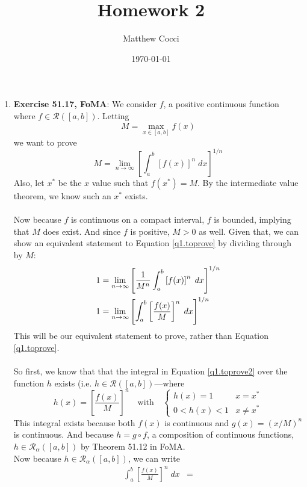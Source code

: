 \documentclass[12pt]{article}
\author{Matthew Cocci}
\title{\textbf{Homework 2}}
\date{\today}
\theoremstyle{plain}
\theoremstyle{definition}
\theoremstyle{remark}
\begin{document}
\maketitle

\begin{enumerate}
\item \textbf{Exercise 51.17, FoMA}: We consider $f$, a positive continuous function where $f  \in \mathscr{R}([a,b])$. Letting 
    \[ M = \max_{x \in [a,b]} f(x) \]
we want to prove 
\begin{equation}
    \label{q1.toprove}
    M = 
    \lim_{n\rightarrow\infty} \left[\int^b_a \left[f(x)\right]^n
        \; dx\right]^{1/n}
\end{equation}
Also, let $x^*$ be the $x$ value such that $f(x^*)=M$. By the intermediate value theorem, we know such an $x^*$ exists.
\\
\\
Now because $f$ is continuous on a compact interval, $f$ is bounded, implying that $M$ does exist. And since $f$ is positive, $M>0$ as well. Given that, we can show an equivalent statement to Equation \ref{q1.toprove} by dividing through by $M$:
\begin{align}
    1 &= \lim_{n\rightarrow\infty} \left[\frac{1}{M^n} \int^b_a 
        \left[f(x)\right]^n \; dx\right]^{1/n} \notag \\
    1 &= \lim_{n\rightarrow\infty} \left[ \int^b_a 
        \left[\frac{f(x)}{M}\right]^n \; dx\right]^{1/n} 
        \label{q1.toprove2}
\end{align}
This will be our equivalent statement to prove, rather than Equation \ref{q1.toprove}.
\\
\\
So first, we know that that the integral in Equation \ref{q1.toprove2} over the function $h$ exists (i.e. $h \in \mathscr{R}([a,b])$---where
    \[ h(x) = \left[\frac{f(x)}{M}\right]^n 
        \quad \text{with} \quad 
        \begin{cases} h(x) = 1 & x=x^* \\ 0< h(x) < 1 & x\neq x^* 
        \end{cases}\]
This integral exists because both $f(x)$ is continuous and $g(x) = \left(x/M\right)^n$ is continuous. And because $h = g \circ f$, a composition of continuous functions, $h \in \mathscr{R}_\alpha([a,b])$ by Theorem 51.12 in FoMA. 
\\
Now because $h \in \mathscr{R}_\alpha([a,b])$, we can write
\begin{align*}
    \int^b_a \left[\frac{f(x)}{M}\right]^n \; dx &=

\end{align*}
\end{enumerate}
\end{document}
